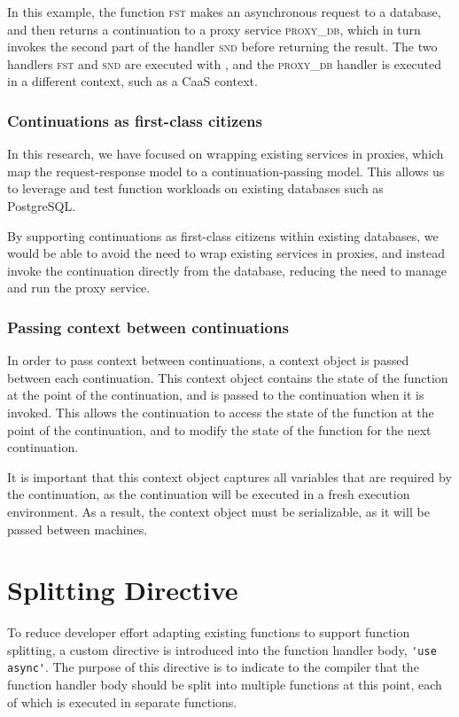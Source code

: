 In this example, the function \textsc{fst} makes an asynchronous request to a database, and then returns a continuation to a proxy service \textsc{proxy_db}, which in turn invokes the second part of the handler \textsc{snd} before returning the result. The two handlers \textsc{fst} and \textsc{snd} are executed with \faas{}, and the \textsc{proxy_db} handler is executed in a different context, such as a CaaS context.

\subsubsection{Continuations as first-class citizens}
In this research, we have focused on wrapping existing services in proxies, which map the request-response model to a continuation-passing model. This allows us to leverage and test function workloads on existing databases such as PostgreSQL.

By supporting continuations as first-class citizens within existing databases, we would be able to avoid the need to wrap existing services in proxies, and instead invoke the continuation directly from the database, reducing the need to manage and run the proxy service.

\subsubsection{Passing context between continuations}
In order to pass context between continuations, a context object is passed between each continuation. This context object contains the state of the function at the point of the continuation, and is passed to the continuation when it is invoked. This allows the continuation to access the state of the function at the point of the continuation, and to modify the state of the function for the next continuation.

It is important that this context object captures all variables that are required by the continuation, as the continuation will be executed in a fresh execution environment. As a result, the context object must be serializable, as it will be passed between machines.

\section{Splitting Directive}
To reduce developer effort adapting existing functions to support function splitting, a custom directive is introduced into the function handler body, \verb|'use async'|. The purpose of this directive is to indicate to the \faaasc{} compiler that the function handler body should be split into multiple functions at this point, each of which is executed in separate \awslambda{} functions.

